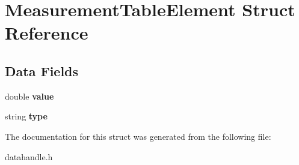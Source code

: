 \hypertarget{structMeasurementTableElement}{\section{Measurement\-Table\-Element Struct Reference}
\label{structMeasurementTableElement}
}
\subsection*{Data Fields}
\begin{DoxyCompactItemize}
\item 
\hypertarget{structMeasurementTableElement_a09bf3e633b31de23095f7ba45ccfdeb5}{double {\bfseries value}}\label{structMeasurementTableElement_a09bf3e633b31de23095f7ba45ccfdeb5}

\item 
\hypertarget{structMeasurementTableElement_acc25aa0102c3bcb6a744c0ae1cf7f04b}{string {\bfseries type}}\label{structMeasurementTableElement_acc25aa0102c3bcb6a744c0ae1cf7f04b}

\end{DoxyCompactItemize}


The documentation for this struct was generated from the following file\-:\begin{DoxyCompactItemize}
\item 
datahandle.\-h\end{DoxyCompactItemize}
